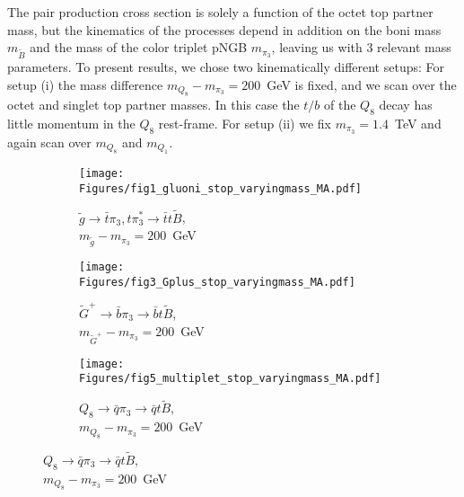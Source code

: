\documentclass[preprintnumbers,nofootinbib,showpacs,eqsecnum,pre,12pt]{revtex4-1}
\begin{document}
The pair production cross section is solely a function of the octet top partner mass, but the kinematics of the processes depend in addition on the boni mass $m_{\tilde B}$ and the mass of the color triplet pNGB $m_{\pi_3}$, leaving us with 3 relevant mass parameters. To present results, we chose two kinematically different setups: For setup (i) the mass difference $m_{Q_8}-m_{\pi_3}=200$~GeV
is fixed, and we scan over the octet and singlet top partner masses. In this case the $t/b$ of the $Q_8$ decay has little momentum in the $Q_8$ rest-frame. For setup (ii) we fix $m_{\pi_3}=1.4$~TeV and again scan over $m_{Q_8}$ and $m_{Q_1}$.

\begin{figure}[t]
	\centering
	\begin{subfigure}[]{0.31\linewidth}
		\centering
		\texttt{[image: Figures/fig1\_gluoni\_stop\_varyingmass\_MA.pdf]} 
		\caption{$\tilde g\to \bar t\pi_3, t\pi_3^*\to \bar t t\tilde B$,\\ $m_{\tilde g} - m_{\pi_3} = 200$~GeV}\label{fig:fig1_gluoni_stop_varyingmass_MA}
	\end{subfigure}
	\begin{subfigure}[]{0.31\linewidth}
		\centering 
		\texttt{[image: Figures/fig3\_Gplus\_stop\_varyingmass\_MA.pdf]} 
		\caption{$\tilde G^+\to \bar b\pi_3\to \bar bt\tilde B$,\\ $m_{\tilde G^+}-m_{\pi_3} = 200$~GeV}\label{fig:fig3_Gplus_stop_varyingmass_MA}
	\end{subfigure}
	\begin{subfigure}[]{0.31\linewidth}
		\centering
		\texttt{[image: Figures/fig5\_multiplet\_stop\_varyingmass\_MA.pdf]} 
		\caption{$Q_8\to \bar q\pi_3\to \bar qt\tilde B$,\\ $m_{Q_8} - m_{\pi_3} = 200$~GeV}\label{fig:fig5_multiplet_stop_varyingmass_MA}
	\end{subfigure}
	\vspace{1.5ex}


\end{figure}
\end{document}
